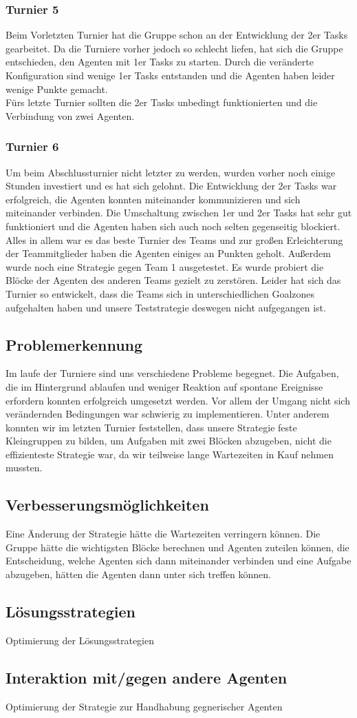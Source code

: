 \subsubsection{Turnier 5}
Beim Vorletzten Turnier hat die Gruppe schon an der Entwicklung der 2er Tasks gearbeitet. Da die Turniere vorher jedoch so schlecht liefen, hat sich die Gruppe entschieden, den Agenten mit 1er Tasks zu starten. Durch die veränderte Konfiguration sind wenige 1er Tasks entstanden und die Agenten haben leider wenige Punkte gemacht. \\
Fürs letzte Turnier sollten die 2er Tasks unbedingt funktionierten und die Verbindung von zwei Agenten.

\subsubsection{Turnier 6}
Um beim Abschlussturnier nicht letzter zu werden, wurden vorher noch einige Stunden investiert und es hat sich gelohnt. Die Entwicklung der 2er Tasks war erfolgreich, die Agenten konnten miteinander kommunizieren und sich miteinander verbinden. Die Umschaltung zwischen 1er und 2er Tasks hat sehr gut funktioniert und die Agenten haben sich auch noch selten gegenseitig blockiert. \\
Alles in allem war es das beste Turnier des Teams und zur großen Erleichterung der Teammitglieder haben die Agenten einiges an Punkten geholt.
Außerdem wurde noch eine Strategie gegen Team 1 ausgetestet. Es wurde probiert die Blöcke der Agenten des anderen Teams gezielt zu zerstören. Leider hat sich das Turnier so entwickelt, dass die Teams sich in unterschiedlichen Goalzones aufgehalten haben und unsere Teststrategie deswegen nicht aufgegangen ist.

\subsection{Problemerkennung}
Im laufe der Turniere sind uns verschiedene Probleme begegnet. Die Aufgaben, die im Hintergrund ablaufen und weniger Reaktion auf spontane Ereignisse erfordern konnten erfolgreich umgesetzt werden. Vor allem der Umgang nicht sich verändernden Bedingungen war schwierig zu implementieren. Unter anderem konnten wir im letzten Turnier feststellen, dass unsere Strategie feste Kleingruppen zu bilden, um Aufgaben mit zwei Blöcken abzugeben, nicht die effizienteste Strategie war, da wir teilweise lange Wartezeiten in Kauf nehmen mussten.

\subsection{Verbesserungsmöglichkeiten}
Eine Änderung der Strategie hätte die Wartezeiten verringern können. Die Gruppe hätte die wichtigsten Blöcke berechnen und Agenten zuteilen können, die Entscheidung, welche Agenten sich dann miteinander verbinden und eine Aufgabe abzugeben, hätten die Agenten dann unter sich treffen können.

\subsection{Lösungsstrategien}
Optimierung der Lösungsstrategien

\subsection{Interaktion mit/gegen andere Agenten}
Optimierung der Strategie zur Handhabung gegnerischer Agenten
